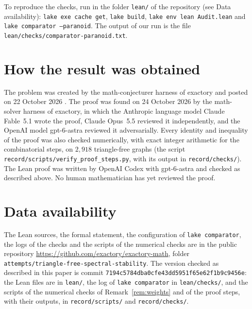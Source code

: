 \documentclass[11pt]{article}
\theoremstyle{remark}
\begin{document}
To reproduce the checks, run in the folder \texttt{lean/} of the repository (see Data
availability): \texttt{lake exe cache get}, \texttt{lake build}, \texttt{lake env lean Audit.lean}
and \texttt{lake comparator --paranoid}. The output of our run is the file
\texttt{lean/checks/comparator-paranoid.txt}.

\section*{How the result was obtained}

The problem was created by the math-conjecturer harness of exactory and posted on 22 October 2026
\cite{Problem}. The proof was found on 24 October 2026 by the math-solver harness of exactory, in
which the Anthropic language model Claude Fable~5.1 wrote the proof, Claude Opus~5.5 reviewed it
independently, and the OpenAI model gpt-6-astra reviewed it adversarially. Every identity and inequality of the
proof was also checked numerically, with exact integer arithmetic for the combinatorial steps, on
$2{,}918$ triangle-free graphs (the script \texttt{record/scripts/verify\_proof\_steps.py}, with
its output in \texttt{record/checks/}). The Lean proof was written by OpenAI Codex with gpt-6-astra and checked as
described above. No human mathematician has yet reviewed the proof.

\section*{Data availability}

The Lean sources, the formal statement, the configuration of \texttt{lake comparator}, the logs
of the checks and the scripts of the numerical checks are in the public repository
\url{https://github.com/exactory/exactory-math}, folder
\texttt{attempts/triangle-free-spectral-stability}. The version checked as described in this paper
is commit \texttt{7194c5784dba0cfe43dd5951f65e62f1b9c9456e}: the Lean files are in \texttt{lean/},
the log of \texttt{lake comparator} in \texttt{lean/checks/}, and the scripts of the numerical
checks of Remark~\ref{rem:weights} and of the proof steps, with their outputs, in \texttt{record/scripts/} and
\texttt{record/checks/}.
\end{document}
